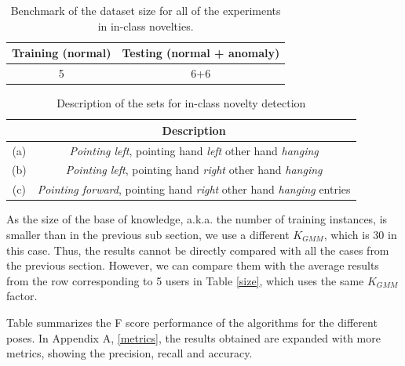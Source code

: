 \begin{table}[h]
    \begin{tabular}{ c c }
    \hline
    Training (normal) & Testing (normal + anomaly) \\\hline
    5 & 6+6 \\
     \hline
    \end{tabular}
    \centering
    \caption{Benchmark of the dataset size for all of the experiments in in-class novelties. \label{Tin}}
\end{table}

\begin{table}[h]
    \begin{tabular}{cc}
    \hline
     & Description \\ 
    \hline
    (a) & \emph{Pointing left}, pointing hand \emph{left} other hand \emph{hanging}   \\
    (b) & \emph{Pointing left}, pointing hand \emph{right} other hand \emph{hanging} \\
    (c) & \emph{Pointing forward}, pointing hand \emph{right} other hand \emph{hanging}  entries \\
    \hline 
    \end{tabular}
    \centering
    \caption{Description of the sets for in-class novelty detection \label{inclass_d}}
\end{table}  

As the size of the base of knowledge, a.k.a. the number of training instances, is smaller than in the previous sub section, we use a different $ K_{GMM} $, which is 30 in this case. Thus, the results cannot be directly compared with all the cases from the previous section. However, we can compare them with the average results from the row corresponding to 5 users in Table \ref{size}, which uses the same $ K_{GMM} $ factor.

Table \label{inclass} summarizes the F score performance of the algorithms for the different poses. In Appendix A, \ref{metrics}, the results obtained are expanded with more metrics, showing the precision, recall and accuracy. 

